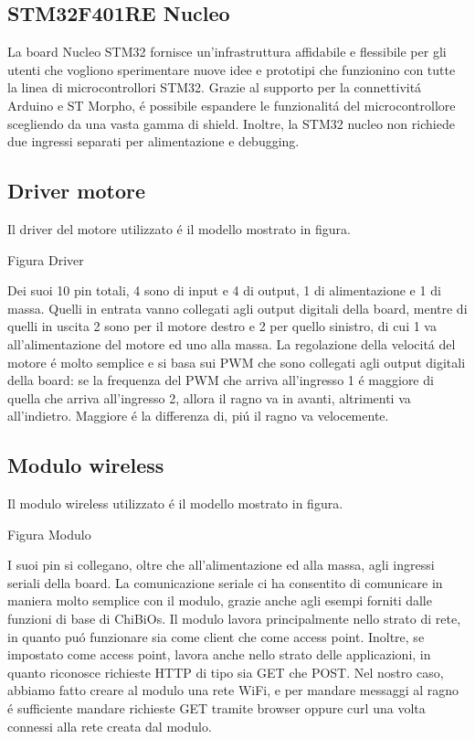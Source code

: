 \documentclass [11pt ,a4paper ,twoside ]{article}
\begin{document}
\subsection{STM32F401RE Nucleo}
La board Nucleo STM32 fornisce un'infrastruttura affidabile e flessibile per gli utenti che vogliono sperimentare nuove idee e prototipi che funzionino con tutte la linea di microcontrollori STM32. Grazie al supporto per la connettivit\'a Arduino e ST Morpho, \'e possibile espandere le funzionalit\'a del microcontrollore scegliendo da una vasta gamma di shield. Inoltre, la STM32 nucleo non richiede due ingressi separati per alimentazione e debugging.

\subsection{Driver motore}
Il driver del motore utilizzato \'e il modello mostrato in figura. 
\begin{center}
Figura Driver
\end{center}
Dei suoi 10 pin totali, 4 sono di input e 4 di output, 1 di alimentazione e 1 di massa. Quelli in entrata vanno collegati agli output digitali della board, mentre di quelli in uscita 2 sono per il motore destro e 2 per quello sinistro, di cui 1 va all'alimentazione del motore ed uno alla massa. La regolazione della velocit\'a del motore \'e molto semplice e si basa sui PWM che sono collegati agli output digitali della board: se la frequenza del PWM  che arriva all'ingresso 1 \'e maggiore di quella che arriva all'ingresso 2, allora il ragno va in avanti, altrimenti va all'indietro. Maggiore \'e la differenza di, pi\'u il ragno va velocemente.

\subsection{Modulo wireless}
Il modulo wireless utilizzato \'e il modello mostrato in figura. 
\begin{center}
Figura Modulo
\end{center}
I suoi pin si collegano, oltre che all'alimentazione ed alla massa, agli ingressi seriali della board. La comunicazione seriale ci ha consentito di comunicare in maniera molto semplice con il modulo, grazie anche agli esempi forniti dalle funzioni di base di ChiBiOs. Il modulo lavora principalmente nello strato di rete, in quanto pu\'o funzionare sia come client che come access point. Inoltre, se impostato come access point, lavora anche nello strato delle applicazioni, in quanto riconosce richieste HTTP di tipo sia GET che POST. Nel nostro caso, abbiamo fatto creare al modulo una rete WiFi, e per mandare messaggi al ragno \'e sufficiente mandare richieste GET tramite browser oppure curl una volta connessi alla rete creata dal modulo.
\end{document}

